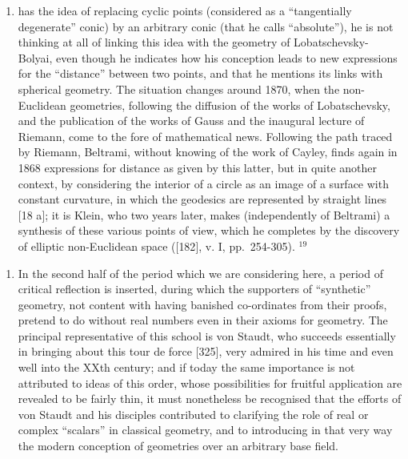 \begin{enumerate}
\def\labelenumi{\arabic{enumi})}
\setcounter{enumi}{591}
\tightlist
\item
  has the idea of replacing cyclic points (considered as a ``tangentially degenerate'' conic) by an arbitrary conic (that he calls ``absolute''), he is not thinking at all of linking this idea with the geometry of Lobatschevsky-Bolyai, even though he indicates how his conception leads to new expressions for the ``distance'' between two points, and that he mentions its links with spherical geometry. The situation changes around 1870, when the non-Euclidean geometries, following the diffusion of the works of Lobatschevsky, and the publication of the works of Gauss and the inaugural lecture of Riemann, come to the fore of mathematical news. Following the path traced by Riemann, Beltrami, without knowing of the work of Cayley, finds again in 1868 expressions for distance as given by this latter, but in quite another context, by considering the interior of a circle as an image of a surface with constant curvature, in which the geodesics are represented by straight lines {[}18 a{]}; it is Klein, who two years later, makes (independently of Beltrami) a synthesis of these various points of view, which he completes by the discovery of elliptic non-Euclidean space ({[}182{]}, v. I, pp.~254-305). \(^{19}\)
\end{enumerate}

\begin{enumerate}
\def\labelenumi{\Alph{enumi})}
\setcounter{enumi}{6}
\tightlist
\item
  In the second half of the period which we are considering here, a period of critical reflection is inserted, during which the supporters of ``synthetic'' geometry, not content with having banished co-ordinates from their proofs, pretend to do without real numbers even in their axioms for geometry. The principal representative of this school is von Staudt, who succeeds essentially in bringing about this tour de force {[}325{]}, very admired in his time and even well into the XXth century; and if today the same importance is not attributed to ideas of this order, whose possibilities for fruitful application are revealed to be fairly thin, it must nonetheless be recognised that the efforts of von Staudt and his disciples contributed to clarifying the role of real or complex ``scalars'' in classical geometry, and to introducing in that very way the modern conception of geometries over an arbitrary base field.
\end{enumerate}

